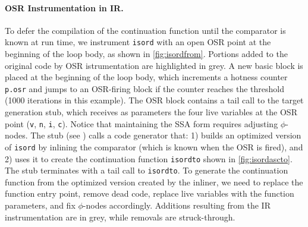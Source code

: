 \paragraph{OSR Instrumentation in IR.}
To defer the compilation of the continuation function until the comparator is known at run time, we instrument {\tt isord} with an open OSR point at the beginning of the loop body, as shown in \myfigure\ref{fig:isordfrom}. Portions added to the original code by OSR istrumentation are highlighted in grey.
A new basic block is placed at the beginning of the loop body, which increments a hotness counter {\tt p.osr} and jumps to an OSR-firing block if the counter reaches the threshold (1000 iterations in this example). The OSR block contains a tail call to the target generation stub, which receives as parameters the four live variables at the OSR point ({\tt v}, {\tt n}, {\tt i}, {\tt c}). Notice that maintaining the SSA form requires adjusting $\phi$-nodes. The stub (see \myfigure[...]) calls a code generator that: 1) builds an optimized version of {\tt isord} by inlining the comparator (which is known when the OSR is fired), and 2) uses it to create the continuation function {\tt isordto} shown in \myfigure\ref{fig:isordascto}. The stub terminates with a tail call to {\tt isordto}. To generate the continuation function from the optimized version created by the inliner, we need to replace the function entry point, remove dead code, replace live variables with the function parameters, and fix $\phi$-nodes accordingly. Additions resulting from the IR instrumentation are in grey, while removals are struck-through.


